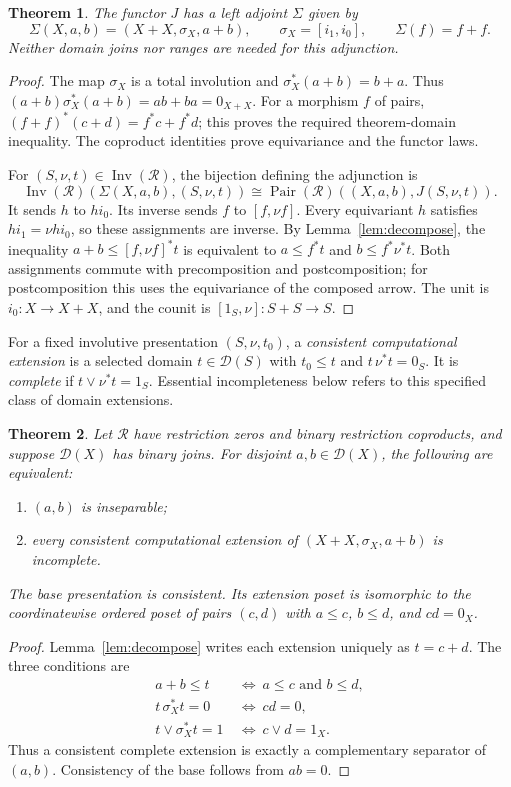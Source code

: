 \documentclass[11pt]{article}
\newtheorem{theorem}{Theorem}[section]
\newcommand{\R}{\mathscr R}
\newcommand{\D}{\mathscr D}
\newcommand{\Pair}{\operatorname{Pair}}
\newcommand{\Inv}{\operatorname{Inv}}
\begin{document}
\begin{theorem}\label{thm:free}
The functor $J$ has a left adjoint $\Sigma$ given by
\[
 \Sigma(X,a,b)=(X+X,\sigma_X,a+b),\qquad
 \sigma_X=[i_1,i_0],\qquad \Sigma(f)=f+f.
\]
Neither domain joins nor ranges are needed for this adjunction.
\end{theorem}
\begin{proof}
The map $\sigma_X$ is a total involution and
$\sigma_X^*(a+b)=b+a$. Thus
$(a+b)\sigma_X^*(a+b)=ab+ba=0_{X+X}$.
For a morphism $f$ of pairs, $(f+f)^*(c+d)=f^*c+f^*d$;
this proves the required theorem-domain inequality. The coproduct
identities prove equivariance and the functor laws.

For $(S,\nu,t)\in\Inv(\R)$, the bijection defining the adjunction is
\[
 \Inv(\R)(\Sigma(X,a,b),(S,\nu,t))
 \cong\Pair(\R)((X,a,b),J(S,\nu,t)).
\]
It sends $h$ to $hi_0$. Its inverse sends $f$ to $[f,\nu f]$.
Every equivariant $h$ satisfies $hi_1=\nu hi_0$, so these assignments
are inverse. By Lemma~\ref{lem:decompose}, the inequality
$a+b\le[f,\nu f]^*t$ is equivalent to
$a\le f^*t$ and $b\le f^*\nu^*t$.
Both assignments commute with precomposition and postcomposition;
for postcomposition this uses the equivariance of the composed arrow.
The unit is $i_0:X\to X+X$, and the counit is
$[1_S,\nu]:S+S\to S$.
\end{proof}

For a fixed involutive presentation $(S,\nu,t_0)$, a
\emph{consistent computational extension} is a selected domain
$t\in\D(S)$ with $t_0\le t$ and $t\,\nu^*t=0_S$.
It is \emph{complete} if $t\vee\nu^*t=1_S$.
Essential incompleteness below refers to this specified class of
domain extensions.

\begin{theorem}\label{thm:signed}
Let $\R$ have restriction zeros and binary restriction coproducts,
and suppose $\D(X)$ has binary joins. For disjoint $a,b\in\D(X)$,
the following are equivalent:
\begin{enumerate}
\item $(a,b)$ is inseparable;
\item every consistent computational extension of
      $(X+X,\sigma_X,a+b)$ is incomplete.
\end{enumerate}
The base presentation is consistent. Its extension poset is isomorphic
to the coordinatewise ordered poset of pairs $(c,d)$ with
$a\le c$, $b\le d$, and $cd=0_X$.
\end{theorem}
\begin{proof}
Lemma~\ref{lem:decompose} writes each extension uniquely as $t=c+d$.
The three conditions are
\[
 \begin{aligned}
 a+b\le t&\ \Longleftrightarrow\ a\le c\text{ and }b\le d,\\
 t\,\sigma_X^*t=0&\ \Longleftrightarrow\ cd=0,\\
 t\vee\sigma_X^*t=1&\ \Longleftrightarrow\ c\vee d=1_X.
 \end{aligned}
\]
Thus a consistent complete extension is exactly a complementary
separator of $(a,b)$. Consistency of the base follows from $ab=0$.
\end{proof}
\end{document}
